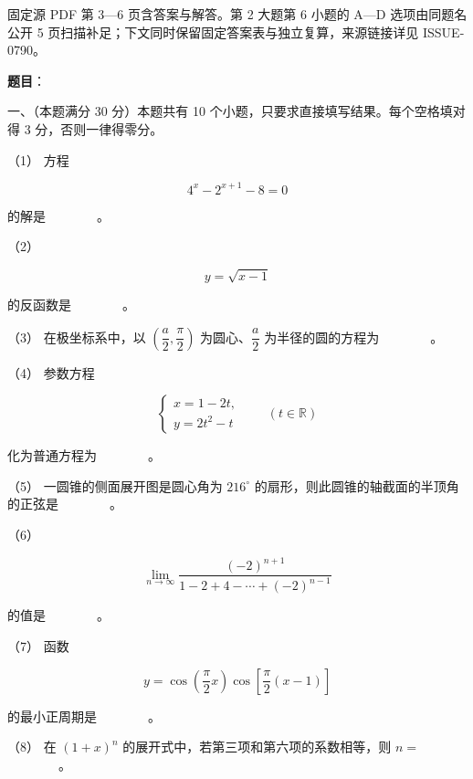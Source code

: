 

\begin{gktip}
固定源 PDF 第 3—6 页含答案与解答。第 2 大题第 6 小题的 A—D 选项由同题名公开 5 页扫描补足；下文同时保留固定答案表与独立复算，来源链接详见 ISSUE-0790。
\end{gktip}

\begin{answer}

\textbf{题目}：

一、（本题满分 30 分）本题共有 10 个小题，只要求直接填写结果。每个空格填对得 3 分，否则一律得零分。

（1） 方程

\nopagebreak[4]
\[
4^x-2^{x+1}-8=0
\]

的解是　　　　。

（2）　

\nopagebreak[4]
\[
y=\sqrt{x-1}
\]

的反函数是　　　　。

（3） 在极坐标系中，以 $\left(\dfrac a2,\dfrac\pi2\right)$ 为圆心、$\dfrac a2$ 为半径的圆的方程为　　　　。

（4） 参数方程

\nopagebreak[4]
\[
\begin{cases}
x=1-2t,\\
y=2t^2-t
\end{cases}
\qquad(t\in\mathbb R)
\]

化为普通方程为　　　　。

（5） 一圆锥的侧面展开图是圆心角为 $216^\circ$ 的扇形，则此圆锥的轴截面的半顶角的正弦是　　　　。

（6）　

\nopagebreak[4]
\[
\lim_{n\to\infty}
\frac{(-2)^{n+1}}{1-2+4-\cdots+(-2)^{n-1}}
\]

的值是　　　　。

（7） 函数

\nopagebreak[4]
\[
y=\cos\left(\frac\pi2x\right)\cos\left[\frac\pi2(x-1)\right]
\]

的最小正周期是　　　　。

（8） 在 $(1+x)^n$ 的展开式中，若第三项和第六项的系数相等，则 $n=$　　　　。


\end{answer}
